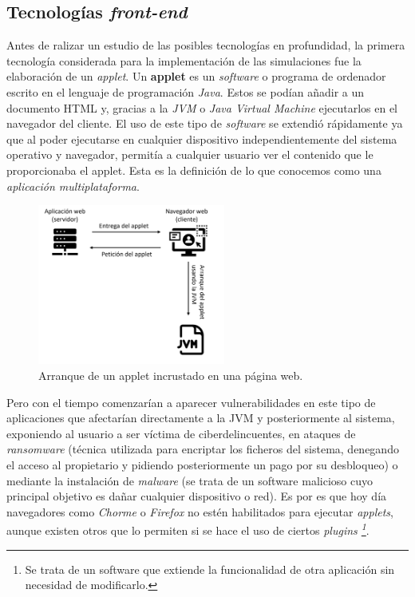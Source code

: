 \documentclass[../main.tex]{subfiles}
\begin{document}
    \subsection{Tecnologías \textit{front-end}}
    Antes de ralizar un estudio de las posibles tecnologías en profundidad, la primera tecnología considerada para la implementación de las simulaciones fue la elaboración de un \textit{applet}. Un \textbf{applet} \cite{aplicacionesyapplets} es un \textit{software} o programa de ordenador escrito en el lenguaje de programación \textit{Java}. Estos se podían añadir a un documento HTML y, gracias a la \textit{JVM} o \textit{Java Virtual Machine} ejecutarlos en el navegador del cliente. El uso de este tipo de \textit{software} se extendió rápidamente ya que al poder ejecutarse en cualquier dispositivo independientemente del sistema operativo y navegador, permitía a cualquier usuario ver el contenido que le proporcionaba el applet. Esta es la definición de lo que conocemos como una \textit{aplicación multiplataforma}.
    
    \begin{figure}[!h]
          \centering
          \includegraphics[width=0.55\textwidth]{images/arranque_applet.png}
          \caption{Arranque de un applet incrustado en una página web.}
          \label{fig:arranque_applet}
      \end{figure}
     
    Pero con el tiempo comenzarían a aparecer vulnerabilidades en este tipo de aplicaciones que afectarían directamente a la JVM y posteriormente al sistema, exponiendo al usuario a ser víctima de ciberdelincuentes, en ataques de \textit{ransomware} (técnica utilizada para encriptar los ficheros del sistema, denegando el acceso al propietario y pidiendo posteriormente un pago por su desbloqueo) o mediante la instalación de \textit{malware} (se trata de un software malicioso cuyo principal objetivo es dañar cualquier dispositivo o red). Es por es que hoy día navegadores como \textit{Chorme} o \textit{Firefox} no estén habilitados para ejecutar \textit{applets}, aunque existen otros que lo permiten si se hace el uso de ciertos \textit{plugins \footnote{Se trata de un software que extiende la funcionalidad de otra aplicación sin necesidad de modificarlo.}}.\\ 
    
\end{document}
